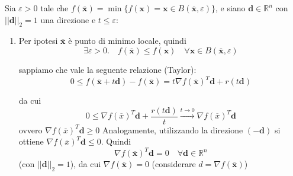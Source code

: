 \begin{thproof} Sia $ \varepsilon > 0$ tale che $f(\mathbf{\overline{x}})
= \min \{ f(\mathbf{x}) = \mathbf{x} \in B(\mathbf{\overline{x}},
\varepsilon)\}$, e siano $\mathbf{d} \in \mathbb{R}^{n}$ con
$||\mathbf{d}||_{2}=1$ una direzione e $ t \leq \varepsilon$:
 \begin{enumerate}
  \item Per ipotesi $\mathbf{\overline{x}}$ è punto di minimo locale,
quindi
 $$ \exists \varepsilon > 0.  \quad f(\mathbf{\overline{x}}) 
\leq f(\mathbf{x}) \quad \forall \mathbf{x} \in 
B(\mathbf{\mathbf{\overline{x}}}, \varepsilon)$$

sappiamo che vale la seguente relazione (Taylor):
$$ 0 \leq f(\mathbf{\overline{x}} + t\mathbf{d}) - f(\mathbf{\overline{x}}) = 
t \nabla f(\mathbf{\overline{x}})^{T}\mathbf{d} + r(t \mathbf{d}) $$

da cui
$$ 0 \leq \nabla f(\overline{x})^{T}\mathbf{d} + \dfrac{r(t\mathbf{d})}{t} \xrightarrow{t \to 0}
\nabla f(\overline{x})^{T}\mathbf{d}$$ ovvero $\nabla
f(\overline{x})^{T}\mathbf{d} \geq 0$ Analogamente, utilizzando la
direzione $(-\mathbf{d})$ si ottiene $\nabla
f(\overline{x})^{T}\mathbf{d} \leq 0$.  Quindi
$$\nabla f(\mathbf{\overline{x}})^{T}\mathbf{d} =0 \quad \forall \mathbf{d} \in \mathbb{R}^{n}$$
(con $||\mathbf{d}||_{2}=1$), da cui $\nabla
f(\mathbf{\overline{x}})=0$ (considerare $d = \nabla
f(\mathbf{\overline{x}})$)



\end{enumerate}
\end{thproof}

